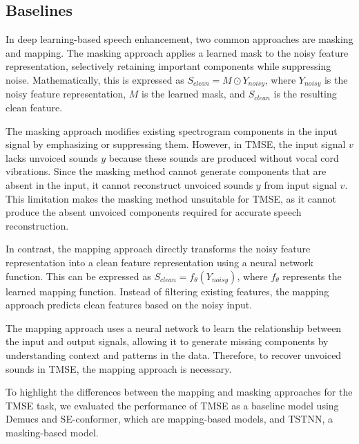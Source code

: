 \documentclass[10pt]{wlscirep}
\begin{document}
\subsection*{Baselines}
In deep learning-based speech enhancement, two common approaches are masking and mapping\cite{Yuliani2021review}. The masking approach applies a learned mask to the noisy feature representation, selectively retaining important components while suppressing noise\cite{Yuliani2021review}. Mathematically, this is expressed as $S_{clean}=M\odot Y_{noisy}$, where $Y_{noisy}$ is the noisy feature representation, $M$ is the learned mask, and $S_{clean}$ is the resulting clean feature.

The masking approach modifies existing spectrogram components in the input signal by emphasizing or suppressing them. However, in TMSE, the input signal $v$ lacks unvoiced sounds $y$ because these sounds are produced without vocal cord vibrations. Since the masking method cannot generate components that are absent in the input, it cannot reconstruct unvoiced sounds $y$ from input signal $v$. This limitation makes the masking method unsuitable for TMSE, as it cannot produce the absent unvoiced components required for accurate speech reconstruction.

In contrast, the mapping approach directly transforms the noisy feature representation into a clean feature representation using a neural network function\cite{Yuliani2021review}. This can be expressed as $S_{clean}=f_\theta(Y_{noisy})$, where $f_\theta$ represents the learned mapping function. Instead of filtering existing features, the mapping approach predicts clean features based on the noisy input.

The mapping approach uses a neural network to learn the relationship between the input and output signals, allowing it to generate missing components by understanding context and patterns in the data. Therefore, to recover unvoiced sounds in TMSE, the mapping approach is necessary. 

To highlight the differences between the mapping and masking approaches for the TMSE task, we evaluated the performance of TMSE as a baseline model using Demucs\cite{defossez2020real} and SE-conformer\cite{kim21seconformer}, which are mapping-based models, and TSTNN\cite{wang2021tstnn}, a masking-based model.
\end{document}

